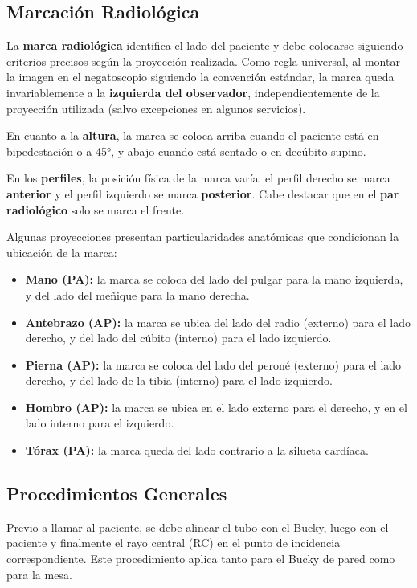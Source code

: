 \subsection*{Marcación Radiológica}

La \textbf{marca radiológica} identifica el lado del paciente y debe colocarse
siguiendo criterios precisos según la proyección realizada. Como regla universal,
al montar la imagen en el negatoscopio siguiendo la convención estándar, la marca
queda invariablemente a la \textbf{izquierda del observador}, independientemente
de la proyección utilizada (salvo excepciones en algunos servicios).

En cuanto a la \textbf{altura}, la marca se coloca arriba cuando el paciente está
en bipedestación o a 45°, y abajo cuando está sentado o en decúbito supino.

En los \textbf{perfiles}, la posición física de la marca varía: el perfil derecho
se marca \textbf{anterior} y el perfil izquierdo se marca \textbf{posterior}. Cabe
destacar que en el \textbf{par radiológico} solo se marca el frente.

Algunas proyecciones presentan particularidades anatómicas que condicionan la
ubicación de la marca:

\begin{itemize}
    \item \textbf{Mano (PA):} la marca se coloca del lado del pulgar para la mano
    izquierda, y del lado del meñique para la mano derecha.
    \item \textbf{Antebrazo (AP):} la marca se ubica del lado del radio (externo)
    para el lado derecho, y del lado del cúbito (interno) para el lado izquierdo.
    \item \textbf{Pierna (AP):} la marca se coloca del lado del peroné (externo)
    para el lado derecho, y del lado de la tibia (interno) para el lado izquierdo.
    \item \textbf{Hombro (AP):} la marca se ubica en el lado externo para el derecho,
    y en el lado interno para el izquierdo.
    \item \textbf{Tórax (PA):} la marca queda del lado contrario a la silueta
    cardíaca.
\end{itemize}

\subsection*{Procedimientos Generales}

Previo a llamar al paciente, se debe alinear el tubo con el Bucky, luego con el
paciente y finalmente el rayo central (RC) en el punto de incidencia correspondiente.
Este procedimiento aplica tanto para el Bucky de pared como para la mesa.

